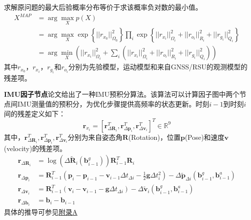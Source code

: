 求解原问题的最大后验概率分布等价于求该概率负对数的最小值。
\begin{equation}
    \begin{aligned}
        X^{MAP}&=\arg\max\limits_{X}p(X)\\
        &=\arg\max\limits_{X}\exp\left\{||r_{x_0}||_{\Omega_0}^2\right\}\prod\limits_i\exp\left\{||r_{x_i}||_{\Omega_i}^2+||r_{o_i}||_{R_i}^2+||r_{g_i}||_{Q_i}^2\right\}\\
        &=\arg\min\limits_{X}\left(||r_{x_i}||_{\Omega_i}^2+\sum\limits_i\left(||r_{x_i}||_{\Omega_i}^2+||r_{o_i}||_{R_i}^2+||r_{g_i}||_{Q_i}^2\right)\right)
    \end{aligned}
    \label{eq5.11}
\end{equation}
其中$r_{x_0}$，${r_{x_i}}$，$r_{g_i}$和$r_{o_i}$分别为先验模型，运动模型和来自GNSS/RSU的观测模型的残差项。


\textbf{IMU因子节点}论文\cite{forster2016manifold}给出了一种IMU预积分算法。该算法可以计算因子图中两个节点间IMU测量值的预积分，为优化步骤提供高频率的状态更新。时刻$i-1$到时刻$i$间的残差定义如下：
\begin{equation}
    \mathbf{r}_{x_i}=[\mathbf{r}^T_{\Delta\mathbf{R}_i}, \mathbf{r}^T_{\Delta\mathbf{p}_i},\mathbf{r}^T_{\Delta\mathbf{v}_i}]^T\in\mathbb{R}^9
\end{equation}
其中，$\mathbf{r}^T_{\Delta\mathbf{R}_i}, \mathbf{r}^T_{\Delta\mathbf{p}_i},\mathbf{r}^T_{\Delta\mathbf{v}_i}$分别为来自姿态角$\mathbf{R}$(Rotation)，位置$\mathbf{p}$(Pose)和速度$\mathbf{v}$(velocity)的残差项。\begin{equation}
    \begin{aligned}
        \mathbf{r}_{\Delta\mathbf{R}_i} &=\log\left(\Delta\tilde{\mathbf{R}}_{i}(\mathbf{b}_{i-1}^g)\right)\mathbf{R}_{i-1}^T\mathbf{R}_i  \\
        \mathbf{r}_{\Delta\mathbf{p}_i} &=\mathbf{R}_{i-1}^T\left(\mathbf{p}_i-\mathbf{p}_{i-1}-\mathbf{v}_{i-1}\Delta t_{\Delta i}-\frac{1}{2}\mathbf{g}\Delta t_{i}^2\right) -\Delta\tilde{\mathbf{p}}_{\Delta i}(\mathbf{b}_{i-1}^g,\mathbf{b}_{i-1}^a) \\
        \mathbf{r}_{\Delta\mathbf{v}_i} &=\mathbf{R}_{i-1}^T\left(\mathbf{v}_i-\mathbf{v}_{i-1}-\mathbf{g}\Delta t_{\Delta i}\right) -\Delta\tilde{\mathbf{v}}_{i}(\mathbf{b}^g_{i-1},\mathbf{b}^a_{i-1})  \\
        \mathbf{r}_{\Delta\mathbf{b}_i} &=\mathbf{b}_i-\mathbf{b}_{i-1} 
        \end{aligned}
\end{equation}
具体的推导可参见\hyperref[app1]{附录A}

